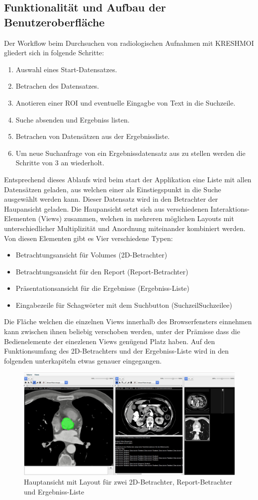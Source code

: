 \subsection{Funktionalität und Aufbau der Benutzeroberfläche}
\label{sec:Funktionalität und Aufbau der Benutzeroberfläche}
Der Workflow beim Durchsuchen von radiologischen Aufnahmen mit KRESHMOI gliedert sich in folgende Schritte:
\begin{enumerate}
	\item Auswahl eines Start-Datensatzes.
	\item Betrachen des Datensatzes.
	\item Anotieren einer ROI und eventuelle Eingagbe von Text in die Suchzeile.
	\item Suche absenden und Ergebniss listen.
	\item Betrachen von Datensätzen aus der Ergebnissliste.
	\item Um neue Suchanfrage von ein Ergebnissdatensatz aus zu stellen werden die Schritte von 3 an wiederholt.
\end{enumerate}
Entsprechend dieses Ablaufs wird beim start der Applikation eine Liste mit allen Datensätzen geladen, 
aus welchen einer als Einstiegspunkt in die Suche ausgewählt werden kann.
Dieser Datensatz wird in den Betrachter der Haupansicht geladen.
Die Haupansicht setzt sich aus verschiedenen Interaktions-Elementen (Views) zusammen,
welchen in mehreren möglichen Layouts mit unterschiedlicher Multiplizität und Anordnung miteinander kombiniert werden.
Von diesen Elementen gibt es Vier verschiedene Typen:
\begin{itemize}
	\item Betrachtungsansicht für Volumes (2D-Betrachter)
	\item Betrachtungsansicht für den Report (Report-Betrachter)
	\item Präsentationsansicht für die Ergebnisse (Ergebniss-Liste)
	\item Eingabezeile für Schagwörter mit dem Suchbutton (SuchzeilSuchzeilee)
\end{itemize}
Die Fläche welchen die einzelnen Views innerhalb des Browserfensters einnehmen kann zwischen ihnen beliebig verschoben werden, 
unter der Prämisse dass die Bedienelemente der einezlenen Views genügend Platz haben.
Auf den Funktionsumfang des 2D-Betrachters und der Ergebniss-Liste wird in den folgenden unterkapiteln etwas genauer eingegangen.
\begin{figure}[t]
	\centering
		\includegraphics[width=0.8\linewidth]{img/c3_application_standard.jpg}
	\caption{Hauptansicht mit Layout für zwei 2D-Betrachter, Report-Betrachter und Ergebniss-Liste}
\end{figure}


